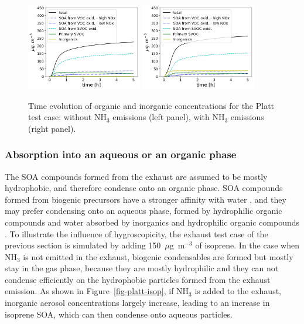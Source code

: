 \documentclass[a4paper,11pt]{article}
\begin{document}
\begin{figure}[H]
        \begin{center}
                \includegraphics[angle=0,width=0.45\textwidth]{../graph/figure_ref/platt-particles.png}
                \includegraphics[angle=0,width=0.45\textwidth]{../graph/figure_ref/platt-particles-nh3.png}
        \end{center}
	\caption{Time evolution of organic and inorganic concentrations for the Platt test case: without NH$_3$ emissions (left panel), with NH$_3$ emissions (right panel).}
\label{fig-platt}
\end{figure}

\subsubsection{Absorption into an aqueous or an organic phase}
\label{hybhyd}

The SOA compounds formed from the exhaust are assumed to be mostly hydrophobic, and
therefore condense onto an organic phase. SOA compounds formed from biogenic precursors have a stronger affinity with water \cite{couvidat11, couvidat2012}, and they may prefer condensing onto an aqueous phase, formed by hydrophilic organic compounds and water absorbed by inorganics and hydrophilic organic compounds \cite{kim2019}.
To illustrate the influence of hygroscopicity, the exhaust test case of the previous section is simulated by adding 150~$\mu$g~m$^{-3}$ of isoprene. In the case when NH$_3$ is not emitted in the exhaust, biogenic condensables are formed but mostly stay in the gas phase, because they are mostly hydrophilic and 
they can not condense efficiently on the hydrophobic particles formed from the exhaust emission.
As shown in Figure~\ref{fig-platt-isop}, if NH$_3$ is added to the exhaust, inorganic aerosol concentrations largely increase, leading to an increase in isoprene SOA, which can then condense onto aqueous particles.
\end{document}

